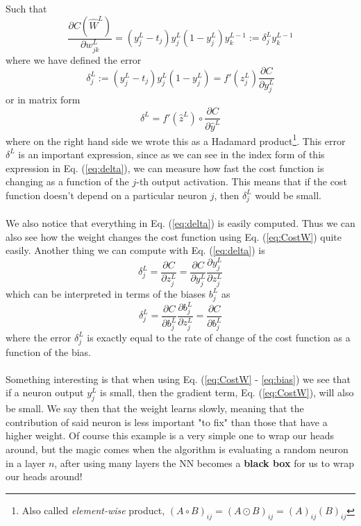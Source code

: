 \documentclass[12pt, a4paper]{book}
\begin{document}
Such that
\begin{equation}\label{eq:CostW}
    \frac{\partial C(\hat W ^L) }{\partial w_{jk}^L}=\left(y_j^L-t_j\right)y_j^L(1-y_j^L)y_k^{L-1} :=\delta_j^Ly_k^{L-1}
\end{equation}
where we have defined the error
\begin{equation}\label{eq:delta}
    \delta_j^L:=\left(y_j^L-t_j\right)y_j^L(1-y_j^L)=f'(z_j^L)\frac{\partial C}{\partial y_j^L} 
\end{equation}
or in matrix form
$$
\delta^L = f'(\hat z ^L)\circ \frac{\partial C}{\partial \hat y ^L}
$$
where on the right hand side we wrote this as a Hadamard product\footnote{Also called \textit{element-wise} product, $(A\circ B)_{ij} = (A\odot B)_{ij} = (A)_{ij}(B)_{ij}$}. This error $\delta^L$ is an important expression, since as we can see in the index form of this expression in Eq. (\ref{eq:delta}), we can measure how fast 
the cost function is changing as a function of the $j$-th output activation. This means that if the cost function doesn't depend on a particular neuron $j$, then $\delta_j^L$ would be small.  \\
\\We also notice that everything in Eq. (\ref{eq:delta}) is easily computed. Thus we can also see how the weight changes the cost function using Eq. (\ref{eq:CostW}) quite easily. 
Another thing we can compute with Eq. (\ref{eq:delta}) is
$$
\delta_j^L=\frac{\partial C}{\partial z_j^L} =\frac{\partial C}{\partial y_j^L}\frac{\partial y_j^L}{\partial z_j^L}
$$
which can be interpreted in terms of the biases $b_j^L$ as
\begin{equation}\label{eq:bias}
    \delta_j^L=\frac{\partial C}{\partial b_j^L}\frac{\partial b_j^L}{\partial z_j^L} = \frac{\partial C}{\partial b_j^L} 
\end{equation}
where the error $\delta_j^L$ is exactly equal to the rate of change of the cost function as a function of the bias.\\
\\Something interesting is that when using Eq. (\ref{eq:CostW} - \ref{eq:bias}) we see that if a neuron output $y_j^L$ is small, then the gradient term, Eq. (\ref{eq:CostW}), will also be small. We say then that the weight learns 
slowly, meaning that the contribution of said neuron is less important "to fix" than those that have a higher weight. Of course this example is a very simple one to wrap our heads around, but the magic comes when the algorithm is 
evaluating a random neuron in a layer $n$, after using many layers the NN becomes a \textbf{black box} for us to wrap our heads around!\\
\end{document}
